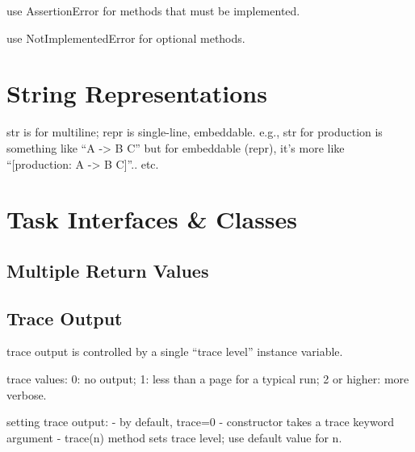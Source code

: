\documentclass{article}
\begin{document}
  use AssertionError for methods that must be implemented.

  use NotImplementedError for optional methods.

\section{String Representations}

  str is for multiline; repr is single-line, embeddable.  e.g., str
  for production is something like ``A -> B C'' but for embeddable
  (repr), it's more like ``[production: A -> B C]''..  etc.

\section{Task Interfaces & Classes}

  \subsection{Multiple Return Values}

  \subsection{Trace Output}

    trace output is controlled by a single ``trace level'' instance
    variable.

    trace values: 0: no output; 1: less than a page for a typical
    run; 2 or higher: more verbose.

    setting trace output:
      - by default, trace=0
      - constructor takes a trace keyword argument
      - trace(n) method sets trace level; use default value for n.
\end{document}
